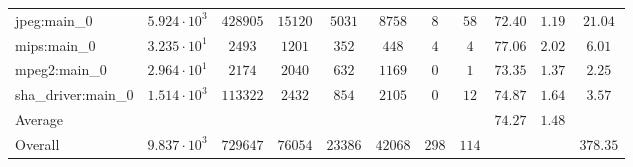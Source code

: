 \begin{tabular}{|l|c|c|c|c|c|c|c|c|c|c|}
jpeg:main\_0            & $ 5.924 \cdot 10^{3} $ & $ 428905 $ & $ 15120 $ & $ 5031  $ & $ 8758  $ & $ 8   $ & $ 58  $ & $ 72.40       $ & $ 1.19    $ & $ 21.04   $ \\
mips:main\_0            & $ 3.235 \cdot 10^{1} $ & $ 2493   $ & $ 1201  $ & $ 352   $ & $ 448   $ & $ 4   $ & $ 4   $ & $ 77.06       $ & $ 2.02    $ & $ 6.01    $ \\
mpeg2:main\_0           & $ 2.964 \cdot 10^{1} $ & $ 2174   $ & $ 2040  $ & $ 632   $ & $ 1169  $ & $ 0   $ & $ 1   $ & $ 73.35       $ & $ 1.37    $ & $ 2.25    $ \\
sha\_driver:main\_0     & $ 1.514 \cdot 10^{3} $ & $ 113322 $ & $ 2432  $ & $ 854   $ & $ 2105  $ & $ 0   $ & $ 12  $ & $ 74.87       $ & $ 1.64    $ & $ 3.57    $ \\
\hline
Average                 & $                    $ & $        $ & $       $ & $       $ & $       $ & $     $ & $     $ & $ 74.27       $ & $ 1.48    $ & $         $ \\
\hline
Overall                 & $ 9.837 \cdot 10^{3} $ & $ 729647 $ & $ 76054 $ & $ 23386 $ & $ 42068 $ & $ 298 $ & $ 114 $ & $             $ & $         $ & $ 378.35  $ \\
\hline
\end{tabular}
